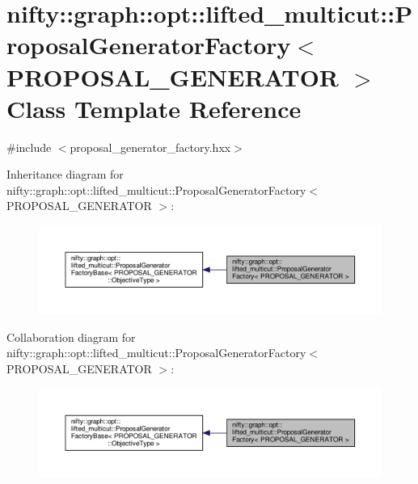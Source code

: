 \hypertarget{classnifty_1_1graph_1_1opt_1_1lifted__multicut_1_1ProposalGeneratorFactory}{}\section{nifty\+:\+:graph\+:\+:opt\+:\+:lifted\+\_\+multicut\+:\+:Proposal\+Generator\+Factory$<$ P\+R\+O\+P\+O\+S\+A\+L\+\_\+\+G\+E\+N\+E\+R\+A\+T\+OR $>$ Class Template Reference}
\label{classnifty_1_1graph_1_1opt_1_1lifted__multicut_1_1ProposalGeneratorFactory}


{\ttfamily \#include $<$proposal\+\_\+generator\+\_\+factory.\+hxx$>$}



Inheritance diagram for nifty\+:\+:graph\+:\+:opt\+:\+:lifted\+\_\+multicut\+:\+:Proposal\+Generator\+Factory$<$ P\+R\+O\+P\+O\+S\+A\+L\+\_\+\+G\+E\+N\+E\+R\+A\+T\+OR $>$\+:
\nopagebreak
\begin{figure}[H]
\begin{center}
\leavevmode
\includegraphics[width=350pt]{classnifty_1_1graph_1_1opt_1_1lifted__multicut_1_1ProposalGeneratorFactory__inherit__graph}
\end{center}
\end{figure}


Collaboration diagram for nifty\+:\+:graph\+:\+:opt\+:\+:lifted\+\_\+multicut\+:\+:Proposal\+Generator\+Factory$<$ P\+R\+O\+P\+O\+S\+A\+L\+\_\+\+G\+E\+N\+E\+R\+A\+T\+OR $>$\+:
\nopagebreak
\begin{figure}[H]
\begin{center}
\leavevmode
\includegraphics[width=350pt]{classnifty_1_1graph_1_1opt_1_1lifted__multicut_1_1ProposalGeneratorFactory__coll__graph}
\end{center}
\end{figure}
